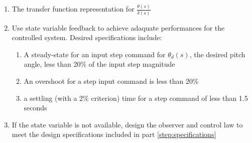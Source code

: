 {\begin{enumerate}[(\alph*)]
  \item The transfer function representation for $\frac{\theta(s)}{\delta(s)}$
  \item Use state variable feedback to achieve adaquate performances for the controlled system.
    Desired specifications include:\label{step:specifications}
    \begin{enumerate}[(\arabic*)]
    \item A steady-state for an input step command for $\theta_d(s)$, the desired pitch angle, less than
      20\% of the input step magnitude
    \item An overshoot for a step input command is less than 20\%
    \item a settling (with a 2\% criterion) time for a step command of less than 1.5 seconds
    \end{enumerate}
  \item If the state variable is not available, design the observer and control law to meet the design
    specifications included in part \ref{step:specifications}
  \end{enumerate}
}{}
